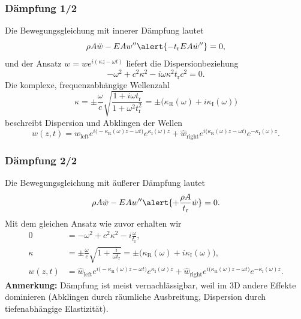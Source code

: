 \begin{frame}
\frametitle{Dämpfung 1/2}
Die Bewegungsgleichung mit \alert{innerer Dämpfung} lautet
\begin{equation*}
\rho A \ddot{w} - EA w'' \alert{-t_\mathrm{r} EA \dot{w}''}=0,
\end{equation*}
und der Ansatz $w=\hat{w}e^{i(\kappa z-\omega t)}$ liefert die Dispersionbeziehung
\begin{equation*}
 -\omega^2+c^2\kappa^2-i\omega\kappa^2t_\mathrm{r}c^2=0.
\end{equation*}
Die komplexe, frequenzabhängige Wellenzahl
\begin{equation*}
\kappa=\pm \frac{\omega}{c}\sqrt{\frac{1+i\omega t_\mathrm{r}}{1+\omega^2t_\mathrm{r}^2}}=\pm\bigl(\kappa_\mathrm{R}(\omega)+i\kappa_\mathrm{I}(\omega)\bigr)
\end{equation*}
beschreibt Dispersion und Abklingen der Wellen
\begin{equation*}
 w(z,t)=\hat{w}_\mathrm{left}e^{i\bigl(-\kappa_\mathrm{R}(\omega) z-\omega t\bigr)}e^{\kappa_\mathrm{I}(\omega) z}
 +\hat{w}_\mathrm{right}e^{i\bigl(\kappa_\mathrm{R}(\omega) z-\omega t\bigr)}e^{-\kappa_\mathrm{I}(\omega) z} .
\end{equation*}
\end{frame}

\begin{frame}
\frametitle{Dämpfung 2/2}
Die Bewegungsgleichung mit \alert{äußerer Dämpfung} lautet
\begin{equation*}
\rho A \ddot{w} - EA w'' \alert{+ \frac{\rho A}{t_\mathrm{r}}\dot{w}}=0.
\end{equation*}
Mit dem gleichen Ansatz wie zuvor erhalten wir
\begin{align*}
 0 &= -\omega^2+c^2\kappa^2-i\frac{\omega}{t_\mathrm{r}} , \\
\kappa &= \pm \frac{\omega}{c}\sqrt{1+\frac{i}{\omega t_\mathrm{r}}}=\pm\bigl(\kappa_\mathrm{R}(\omega)+i\kappa_\mathrm{I}(\omega)\bigr) , \\
w(z,t)&=\hat{w}_\mathrm{left}e^{i\bigl(-\kappa_\mathrm{R}(\omega) z-\omega t\bigr)}e^{\kappa_\mathrm{I}(\omega) z}
 +\hat{w}_\mathrm{right}e^{i\bigl(\kappa_\mathrm{R}(\omega) z-\omega t\bigr)}e^{-\kappa_\mathrm{I}(\omega) z} .
\end{align*}
\textbf{Anmerkung:} Dämpfung ist meist vernachlässigbar, weil im 3D andere Effekte dominieren (Abklingen durch räumliche Ausbreitung, Dispersion durch tiefenabhängige Elastizität). 
\end{frame}

